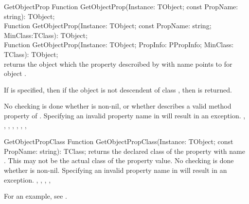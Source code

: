 
\begin{function}{GetObjectProp}
\Declaration
Function GetObjectProp(Instance: TObject; const PropName: string): TObject;\\
Function GetObjectProp(Instance: TObject; const PropName: string; MinClass:TClass): TObject; \\
Function GetObjectProp(Instance: TObject; PropInfo: PPropInfo; MinClass: TClass):
TObject;\\
\Description
{} returns the object which the property descroibed by
 with name  points to for object .

If  is specified, then if the object is not descendent of
class , then  is returned.

\Errors
No checking is done whether  is non-nil, or whether
 describes a valid method property of . 
Specifying an invalid property name in  will result in an
 exception.
\SeeAlso
{}, , ,
, , ,
, 
\end{function}


\begin{function}{GetObjectPropClass}
\Declaration
Function GetObjectPropClass(Instance: TObject; const PropName: string): TClass;                                             
\Description
{} returns the declared class of the property with name 
. This may not be the actual class of the property value.
\Errors
No checking is done whether  is non-nil.
Specifying an invalid property name in  will result in an
 exception.
\SeeAlso
{}, , ,
, 
\end{function}

For an example, see .

